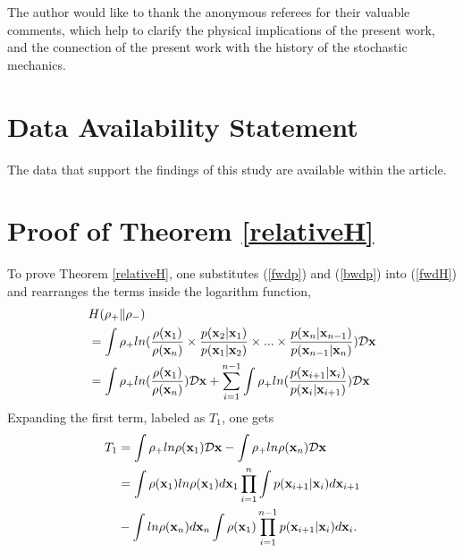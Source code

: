 \documentclass[%
 aip, 
 amsmath,amssymb,amsthm,
 nofootinbib,
 reprint,
]{revtex4-1}
\begin{document}
\begin{acknowledgements}
The author would like to thank the anonymous referees for their valuable comments, which help to clarify the physical implications of the present work, and the connection of the present work with the history of the stochastic mechanics.
\end{acknowledgements}

\section*{Data Availability Statement}
The data that support the findings of this study are available within the article.
 
\appendix

\section{Proof of Theorem \ref{relativeH}}
\label{AppendixA}
To prove Theorem \ref{relativeH}, one substitutes (\ref{fwdp}) and (\ref{bwdp}) into (\ref{fwdH}) and rearranges the terms inside the logarithm function,
\begin{equation}
    \label{PT1}
    \begin{split}
        &H(\rho_+\|\rho_-) \\
        &=\int \rho_+ln(\frac{\rho(\mathbf{x}_1)}{\rho(\mathbf{x}_n)}\times\frac{p(\mathbf{x}_2|\mathbf{x}_1)}{p(\mathbf{x}_1|\mathbf{x}_2)}\times...
        \times \frac{p(\mathbf{x}_n|\mathbf{x}_{n-1})}{p(\mathbf{x}_{n-1}|\mathbf{x}_n)}){\cal{D}}\mathbf{x} \\
        &=\int \rho_+ln(\frac{\rho(\mathbf{x}_1)}{\rho(\mathbf{x}_n)}){\cal{D}}\mathbf{x} + \sum_{i=1}^{n-1} \int \rho_+ ln(\frac{p(\mathbf{x}_{i+1}|\mathbf{x}_{i})}{p(\mathbf{x}_{i}|\mathbf{x}_{i+1})}){\cal{D}}\mathbf{x}
    \end{split}
\end{equation}
Expanding the first term, labeled as $T_1$, one gets
\begin{equation}
    \label{PT2}
    \begin{split}
    T_1 &=\int \rho_+ln\rho(\mathbf{x}_1){\cal{D}}\mathbf{x} - \int \rho_+ln\rho(\mathbf{x}_n){\cal{D}}\mathbf{x} \\
    &=\int \rho(\mathbf{x}_1)ln\rho(\mathbf{x}_1)d\mathbf{x}_1 \prod_{i=1}^n\int p(\mathbf{x}_{i+1}|\mathbf{x}_i)d\mathbf{x}_{i+1}\\
   & -\int ln\rho(\mathbf{x}_n)d\mathbf{x}_n\int\rho(\mathbf{x}_1) \prod_{i=1}^{n-1}p(\mathbf{x}_{i+1}|\mathbf{x}_i)d\mathbf{x}_{i}.
    \end{split}
\end{equation}
\end{document}
